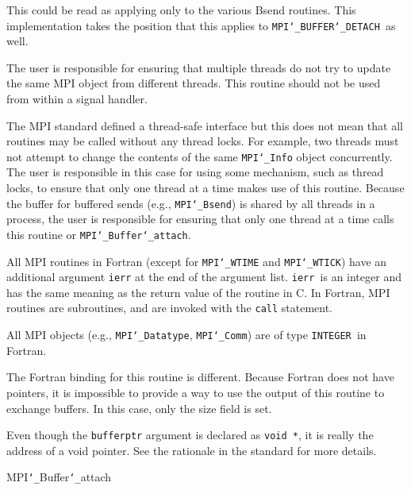 \par
This could be read as applying only to the various Bsend routines.  This
implementation takes the position that this applies to {\tt MPI{\tt \char`\_}BUFFER{\tt \char`\_}DETACH
}as well.
\par
{}
\par
The user is responsible for ensuring that multiple threads do not try to
update the same MPI object from different threads.  This routine should
not be used from within a signal handler.
\par
The MPI standard defined a thread-safe interface but this does not
mean that all routines may be called without any thread locks.  For
example, two threads must not attempt to change the contents of the
same {\tt MPI{\tt \char`\_}Info} object concurrently.  The user is responsible in this
case for using some mechanism, such as thread locks, to ensure that
only one thread at a time makes use of this routine.
Because the buffer for buffered sends (e.g., {\tt MPI{\tt \char`\_}Bsend}) is shared by all
threads in a process, the user is responsible for ensuring that only
one thread at a time calls this routine or {\tt MPI{\tt \char`\_}Buffer{\tt \char`\_}attach}.
\par
{}
All MPI routines in Fortran (except for {\tt MPI{\tt \char`\_}WTIME} and {\tt MPI{\tt \char`\_}WTICK}) have
an additional argument {\tt ierr} at the end of the argument list.  {\tt ierr
}is an integer and has the same meaning as the return value of the routine
in C.  In Fortran, MPI routines are subroutines, and are invoked with the
{\tt call} statement.
\par
All MPI objects (e.g., {\tt MPI{\tt \char`\_}Datatype}, {\tt MPI{\tt \char`\_}Comm}) are of type {\tt INTEGER
}in Fortran.
\par
The Fortran binding for this routine is different.  Because Fortran
does not have pointers, it is impossible to provide a way to use the
output of this routine to exchange buffers.  In this case, only the
size field is set.
\par
{}
Even though the {\tt bufferptr} argument is declared as {\tt void *}, it is
really the address of a void pointer.  See the rationale in the
standard for more details.
\par
{}
 MPI{\tt \char`\_}Buffer{\tt \char`\_}attach
\nextline
{}
\endmanpage
